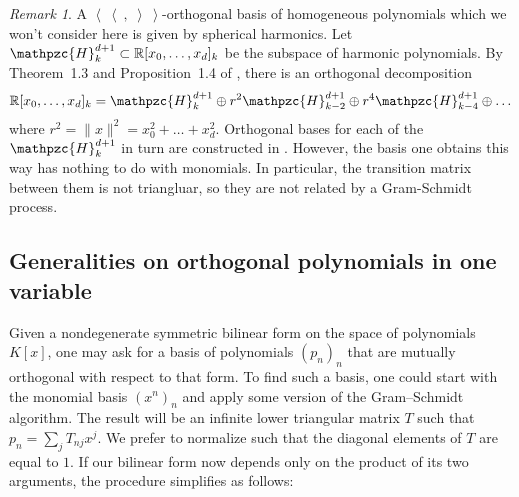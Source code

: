 \documentclass{amsart}
\newcommand{\bra}{\left<\!\!\!\:\left<}
\newcommand{\ket}{\right>\!\!\!\:\right>}
\newcommand{\R}{\mathbb{R}}
\newcommand{\Har}{\mathpzc{H}}
\theoremstyle{plain}
\theoremstyle{definition}
\theoremstyle{remark}
\newtheorem{remark}[theorem]{Remark}
\begin{document}
\begin{remark}\label{sphericalharmonics}
A $\bra\ ,\;\ket$-orthogonal basis of homogeneous polynomials which we won't consider here is given by spherical harmonics. Let $\Har^{d+1}_k \subset \R[x_0,\ldots,x_d]_k$ be the subspace of harmonic polynomials. By Theorem~1.3 and Proposition~1.4 of \cite{Dai}, there is an orthogonal decomposition
$$
\R[x_0,\ldots,x_d]_k = \Har^{d+1}_k \oplus r^2 \Har^{d+1}_{k-2}\oplus r^4 \Har^{d+1}_{k-4}\oplus \ldots
$$
where $r^2 = \|x\|^2= x_0^2+\ldots +x_d^2$. Orthogonal bases for each of the $\Har^{d+1}_k$ in turn are constructed in \cite[Sect.~2.2]{Dunkl}. However, the basis one obtains this way has nothing to do with monomials. In particular, the transition matrix between them is not triangluar, so they are not related by a Gram-Schmidt process.
\end{remark}




\subsection{Generalities on orthogonal polynomials in one variable}
Given a nondegenerate symmetric bilinear form on the space of polynomials $K[x]$, one may ask for a basis of polynomials $(p_n)_n$ that are mutually orthogonal with respect to that form. To find such a basis, one could start with the monomial basis $(x^n)_n$ and apply some version of the Gram--Schmidt algorithm. The result will be an infinite lower triangular matrix $T$ such that $p_n =\sum_j T_{nj} x^j$. We prefer to normalize such that the diagonal elements of $T$ are equal to $1$. If our bilinear form now depends only on the product of its two arguments, the procedure simplifies as follows:
\end{document}
